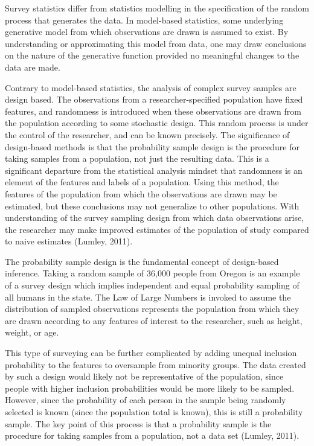\documentclass[12pt,twoside]{reedthesis}
\begin{document}
Survey statistics differ from statistics modelling in the specification
of the random process that generates the data. In model-based
statistics, some underlying generative model from which observations are
drawn is assumed to exist. By understanding or approximating this model
from data, one may draw conclusions on the nature of the generative
function provided no meaningful changes to the data are made.

Contrary to model-based statistics, the analysis of complex survey
samples are design based. The observations from a researcher-specified
population have fixed features, and randomness is introduced when these
observations are drawn from the population according to some stochastic
design. This random process is under the control of the researcher, and
can be known precisely. The significance of design-based methods is that
the probability sample design is the procedure for taking samples from a
population, not just the resulting data. This is a significant departure
from the statistical analysis mindset that randomness is an element of
the features and labels of a population. Using this method, the features
of the population from which the observations are drawn may be
estimated, but these conclusions may not generalize to other
populations. With understanding of the survey sampling design from which
data observations arise, the researcher may make improved estimates of
the population of study compared to naive estimates (Lumley, 2011).

The probability sample design is the fundamental concept of design-based
inference. Taking a random sample of 36,000 people from Oregon is an
example of a survey design which implies independent and equal
probability sampling of all humans in the state. The Law of Large
Numbers is invoked to assume the distribution of sampled observations
represents the population from which they are drawn according to any
features of interest to the researcher, such as height, weight, or age.

This type of surveying can be further complicated by adding unequal
inclusion probability to the features to oversample from minority
groups. The data created by such a design would likely not be
representative of the population, since people with higher inclusion
probabilities would be more likely to be sampled. However, since the
probability of each person in the sample being randomly selected is
known (since the population total is known), this is still a probability
sample. The key point of this process is that a probability sample is
the procedure for taking samples from a population, not a data set
(Lumley, 2011).
\end{document}
